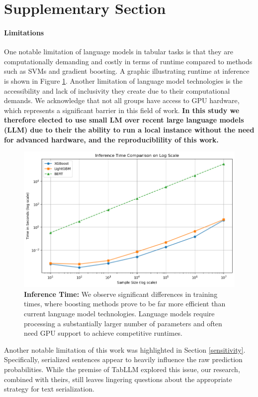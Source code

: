 \documentclass{article}
\theoremstyle{plain}
\theoremstyle{definition}
\theoremstyle{remark}
\begin{document}
\section{Supplementary Section}
\label{supp}

\paragraph{Limitations} One notable limitation of language models in tabular tasks is that they are computationally demanding and costly in terms of runtime compared to methods such as SVMs and gradient boosting. A graphic illustrating runtime at inference is shown in Figure \ref{dd}. Another limitation of language model technologies is the accessibility and lack of inclusivity they create due to their computational demands. We acknowledge that not all groups have access to GPU hardware, which represents a significant barrier in this field of work. \textbf{In this study we therefore elected to use small LM over recent large language models (LLM) due to their the ability to run a local instance without the need for advanced hardware, and the reproduciblility of this work. }

\begin{figure}[h!]
    \centering
    \includegraphics[width=5in]{inference.png}
    \caption{\textbf{Inference Time:} We observe significant differences in training times, where boosting methods prove to be far more efficient than current language model technologies. Language models require processing a substantially larger number of parameters and often need GPU support to achieve competitive runtimes.}
    \label{dd}
\end{figure}

Another notable limitation of this work was highlighted in Section \ref{sensitivity}. Specifically, serialized sentences appear to heavily influence the raw prediction probabilities. While the premise of TabLLM \cite{hegselmann2023tabllm} explored this issue, our research, combined with theirs, still leaves lingering questions about the appropriate strategy for text serialization.
\end{document}
